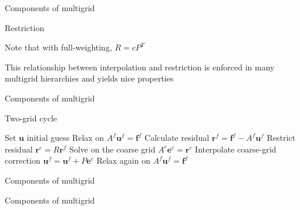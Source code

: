 \documentclass[18pt,xcolor=table]{beamer}
\begin{document}
\begin{frame}{Components of multigrid}
\begin{block}{Restriction}
\bit
\item Note that with full-weighting, $R = cP^T$
\item This relationship between interpolation and restriction is enforced in many multigrid hierarchies and yields nice properties
\eit
\end{block}
\end{frame}

\begin{frame}{Components of multigrid}
\begin{block}{Two-grid cycle}
\begin{algorithm}[H]
\caption{Two-grid cycle}
\begin{algorithmic}
\State Set $\mathbf{u}$ initial guess
\State Relax on $A^f\mathbf{u}^f = \mathbf{f}^f$
\State Calculate residual $\mathbf{r}^f = \mathbf{f}^f - A^f\mathbf{u}^f$
\State Restrict residual $\mathbf{r}^c = R\mathbf{r}^f$
\State Solve on the coarse grid $A^c\mathbf{e}^c = \mathbf{r}^c$
\State Interpolate coarse-grid correction $\mathbf{u}^f = \mathbf{u}^f + P\mathbf{e}^c$
\State Relax again on $A^f\mathbf{u}^f = \mathbf{f}^f$
\end{algorithmic}
\end{algorithm}
\end{block}
\end{frame}













\begin{frame}{Components of multigrid}
\begin{block}{}
\bit
\item 
\eit
\end{block}
\end{frame}

\begin{frame}{Components of multigrid}
\begin{block}{}
\bit
\item 
\eit
\end{block}
\end{frame}

\end{document}
